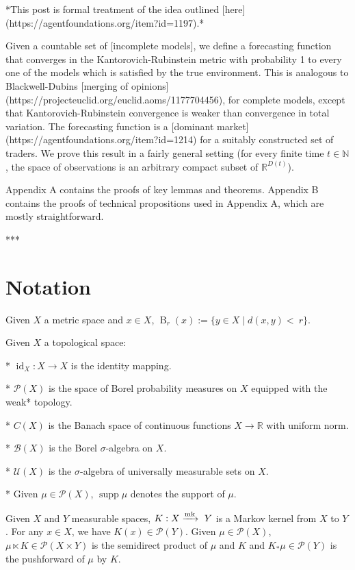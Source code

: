 \documentclass[a4paper]{article}
\DeclareMathOperator{\Supp}{supp}
\newcommand{\Nats}{\mathbb{N}}
\newcommand{\Reals}{\mathbb{R}}
\newcommand{\Markov}{\xrightarrow{\textnormal{mk}}}
\newcommand{\Prob}{\mathcal{P}}
\newcommand{\UM}{\mathcal{U}}
\newcommand{\I}{\operatorname{id}}
\newcommand{\Ball}{\operatorname{B}}
\begin{document}
*This post is formal treatment of the idea outlined [here](https://agentfoundations.org/item?id=1197).*

Given a countable set of [incomplete models], we define a forecasting function that converges in the Kantorovich-Rubinstein metric with probability 1 to every one of the models which is satisfied by the true environment. This is analogous to Blackwell-Dubins [merging of opinions](https://projecteuclid.org/euclid.aoms/1177704456), for complete models, except that Kantorovich-Rubinstein convergence is weaker than convergence in total variation. The forecasting function is a [dominant market](https://agentfoundations.org/item?id=1214) for a suitably constructed set of traders. We prove this result in a fairly general setting (for every finite time $t \in \Nats$, the space of observations is an arbitrary compact subset of $\Reals^{D(t)}$).%

Appendix A contains the proofs of key lemmas and theorems. Appendix B contains the proofs of technical propositions used in Appendix A, which are mostly straightforward.

***

\section{Notation}

Given ${X}$ a metric space and ${x \in X}$, ${\Ball_r(x):=\{y \in X \mid d(x,y) <\ r\}}$.

Given ${X}$ a topological space:

* ${\I_X: X \rightarrow X}$ is the identity mapping.

* ${\Prob(X)}$ is the space of Borel probability measures on ${X}$ equipped with the weak* topology.

* ${C(X)}$ is the Banach space of continuous functions ${X \rightarrow \Reals}$ with uniform norm.

* ${\mathcal{B}}(X)$ is the Borel ${\sigma}$-algebra on ${X}$.

* ${\UM(X)}$ is the ${\sigma}$-algebra of universally measurable sets on ${X}$.

* Given ${\mu \in \Prob(X)}$, ${\Supp \mu}$ denotes the support of ${\mu}$. 

Given ${X}$ and ${Y}$ measurable spaces, ${K: X \Markov\ Y}$ is a Markov kernel from ${X}$ to ${Y}$. For any ${x \in X}$, we have ${K(x) \in \Prob(Y)}$. Given ${\mu \in \Prob(X)}$, ${\mu \ltimes K \in \Prob(X \times Y)}$ is the semidirect product of ${\mu}$ and ${K}$ and ${K_*\mu \in \Prob(Y)}$ is the pushforward of ${\mu}$ by ${K}$.
\end{document}
